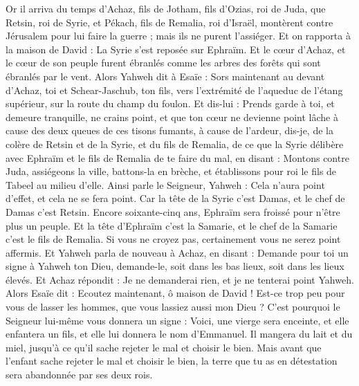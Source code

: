 \begin{multicols}{2}
\VerseOne{}Or il arriva du temps d'Achaz, fils de Jotham, fils d'Ozias, roi de Juda, que Retsin, roi de Syrie, et Pékach, fils de Remalia, roi d'Israël, montèrent contre Jérusalem pour lui faire la guerre ; mais ils ne purent l'assiéger.
Et on rapporta à la maison de David : La Syrie s'est reposée sur Ephraïm. Et le cœur d'Achaz, et le cœur de son peuple furent ébranlés comme les arbres des forêts qui sont ébranlés par le vent.
Alors Yahweh dit à Esaïe : Sors maintenant au devant d'Achaz, toi et Schear-Jaschub, ton fils, vers l'extrémité de l'aqueduc de l'étang supérieur, sur la route du champ du foulon.
Et dis-lui : Prends garde à toi, et demeure tranquille, ne crains point, et que ton cœur ne devienne point lâche à cause des deux queues de ces tisons fumants, à cause de l'ardeur, dis-je, de la colère de Retsin et de la Syrie, et du fils de Remalia,
de ce que la Syrie délibère avec Ephraïm et le fils de Remalia de te faire du mal, en disant :
Montons contre Juda, assiégeons la ville, battons-la en brèche, et établissons pour roi le fils de Tabeel au milieu d'elle.
Ainsi parle le Seigneur, Yahweh : Cela n'aura point d'effet, et cela ne se fera point.
Car la tête de la Syrie c'est Damas, et le chef de Damas c'est Retsin. Encore soixante-cinq ans, Ephraïm sera froissé pour n'être plus un peuple.
Et la tête d'Ephraïm c'est la Samarie, et le chef de la Samarie c'est le fils de Remalia. Si vous ne croyez pas, certainement vous ne serez point affermis.
Et Yahweh parla de nouveau à Achaz, en disant :
Demande pour toi un signe à Yahweh ton Dieu, demande-le, soit dans les bas lieux, soit dans les lieux élevés.
Et Achaz répondit : Je ne demanderai rien, et je ne tenterai point Yahweh.
Alors Esaïe dit : Ecoutez maintenant, ô maison de David ! Est-ce trop peu pour vous de lasser les hommes, que vous lassiez aussi mon Dieu ?
C'est pourquoi le Seigneur lui-même vous donnera un signe : Voici, une vierge sera enceinte, et elle enfantera un fils, et elle lui donnera le nom d'Emmanuel.
Il mangera du lait et du miel, jusqu'à ce qu'il sache rejeter le mal et choisir le bien.
Mais avant que l'enfant sache rejeter le mal et choisir le bien, la terre que tu as en détestation sera abandonnée par ses deux rois.

\end{multicols}
